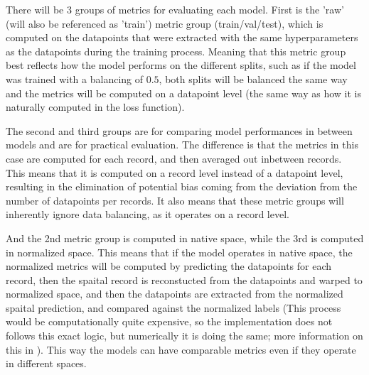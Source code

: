 There will be 3 groups of metrics for evaluating each model. First is the 'raw' (will also be referenced as 'train') metric group (train/val/test), which is computed on the datapoints that were extracted with the same hyperparameters as the datapoints during the training process. Meaning that this metric group best reflects how the model performs on the different splits, such as if the model was trained with a balancing of $0.5$, both splits will be balanced the same way and the metrics will be computed on a datapoint level (the same way as how it is naturally computed in the loss function).\par
The second and third groups are for comparing model performances in between models and are for practical evaluation. The difference is that the metrics in this case are computed for each record, and then averaged out inbetween records. This means that it is computed on a record level instead of a datapoint level, resulting in the elimination of potential bias coming from the deviation from the number of datapoints per records. It also means that these metric groups will inherently ignore data balancing, as it operates on a record level.\par
And the 2nd metric group is computed in native space, while the 3rd is computed in normalized space. This means that if the model operates in native space, the normalized metrics will be computed by predicting the datapoints for each record, then the spaital record is reconstucted from the datapoints and warped to normalized space, and then the datapoints are extracted from the normalized spaital prediction, and compared against the normalized labels (This process would be computationally quite expensive, so the implementation does not follows this exact logic, but numerically it is doing the same; more information on this in ). This way the models can have comparable metrics even if they operate in different spaces.











